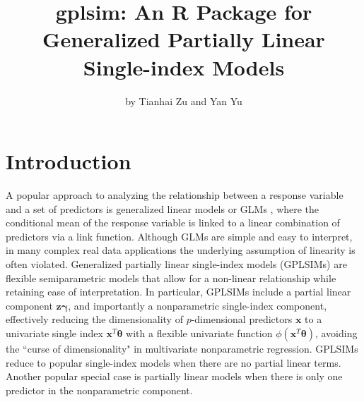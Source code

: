 \title{gplsim: An R Package for Generalized Partially Linear Single-index Models}
\author{by Tianhai Zu and Yan Yu}

\maketitle


\section{Introduction}

A popular approach to analyzing the relationship between a response variable and a set of predictors is generalized linear models or GLMs \cite{mccullagh_generalized_1989}, where the conditional mean of the response variable is linked to a linear combination of predictors via a link function. Although GLMs are simple and easy to interpret, in many complex real data applications the underlying assumption of linearity is often violated. Generalized partially linear single-index models (GPLSIMs) \citep[e.g.][]{carroll_generalized_1997,yu_penalized_2002,yu_penalised_2017} are flexible semiparametric models that allow for a non-linear relationship while retaining ease of interpretation. In particular, GPLSIMs include a partial linear component $\mathbf{z} \boldsymbol{\gamma}$, and importantly a nonparametric single-index component, effectively reducing the dimensionality of $p$-dimensional predictors $\mathbf{x}$ to a univariate single index $\mathbf{x}^{T} \boldsymbol{\theta}$ with a flexible univariate function $\phi(\mathbf{x}^{T} \boldsymbol{\theta})$, avoiding the ``curse of dimensionality" in multivariate nonparametric regression. GPLSIMs reduce to popular single-index models \citep{ichimura_semiparametric_1993,hardle_optimal_1993,xia_semi-parametric_2006} when there are no partial linear terms. Another popular special case is partially linear models \cite{hardle_partially_2012} when there is only one predictor in the nonparametric component.

